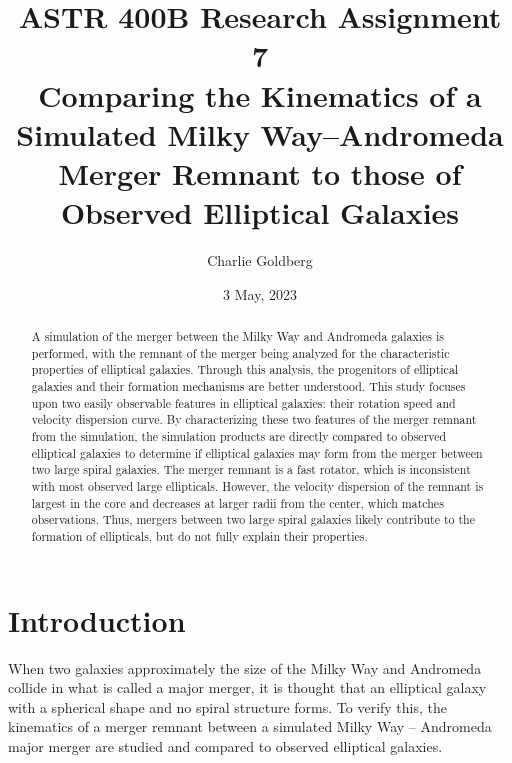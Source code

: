 \documentclass[twocolumn]{aastex63}
\begin{document}
\title{ASTR 400B Research Assignment 7 \\
Comparing the Kinematics of a Simulated Milky Way--Andromeda Merger Remnant to those of Observed Elliptical Galaxies}

\author[0000-0002-4901-7693]{Charlie Goldberg}


\date{3 May, 2023}


\begin{abstract}
    A simulation of the merger between the Milky Way and Andromeda galaxies is performed, with the remnant of the merger being analyzed for the characteristic properties of elliptical galaxies. Through this analysis, the progenitors of elliptical galaxies and their formation mechanisms are better understood. This study focuses upon two easily observable features in elliptical galaxies: their rotation speed and velocity dispersion curve. By characterizing these two features of the merger remnant from the simulation, the simulation products are directly compared to observed elliptical galaxies to determine if elliptical galaxies may form from the merger between two large spiral galaxies. The merger remnant is a fast rotator, which is inconsistent with most observed large ellipticals. However, the velocity dispersion of the remnant is largest in the core and decreases at larger radii from the center, which matches observations. Thus, mergers between two large spiral galaxies likely contribute to the formation of ellipticals, but do not fully explain their properties.
\end{abstract}

\section{Introduction}

When two galaxies approximately the size of the Milky Way and Andromeda collide in what is called a major merger, it is thought that an elliptical galaxy with a spherical shape and no spiral structure forms. To verify this, the kinematics of a merger remnant between a simulated Milky Way -- Andromeda major merger are studied and compared to observed elliptical galaxies.\\
\end{document}
